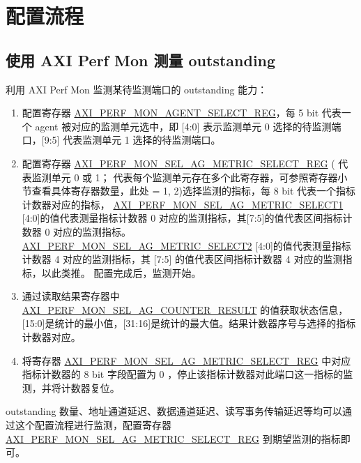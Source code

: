 \documentclass[main\_\_CN.tex]{subfiles}
\begin{document}

\section{配置流程}
\label{sec:aximon-prog-procedures}


\subsection{使用 AXI Perf Mon 测量 outstanding}
利用 AXI Perf Mon 监测某待监测端口的 outstanding 能力：
\begin{enumerate}
    \item 配置寄存器 \hyperref[regdesc:AXIPERFMONAGENTSELECTREG]{AXI\_PERF\_MON\_AGENT\_SELECT\_REG}，每 5 bit 代表一个 agent 被对应的监测单元选中，即 [4:0] 表示监测单元 0 选择的待监测端口，[9:5] 代表监测单元 1 选择的待监测端口。
    \item 配置寄存器 \hyperref[regdesc:AXIPERFMONSELAGNMETRICSELECTMREG]{AXI\_PERF\_MON\_SEL\_AG\_METRIC\_SELECT\_REG} ( 代表监测单元 0 或 1； 代表每个监测单元存在多个此寄存器，可参照寄存器小节查看具体寄存器数量，此处  = 1, 2)选择监测的指标，每 8 bit 代表一个指标计数器对应的指标，  \hyperref[fielddesc:AXIPERFMONSELAGNMETRICSELECTM]{AXI\_PERF\_MON\_SEL\_AG\_METRIC\_SELECT1} [4:0]的值代表测量指标计数器 0 对应的监测指标，其[7:5]的值代表区间指标计数器 0 对应的监测指标。\hyperref[fielddesc:AXIPERFMONSELAGNMETRICSELECTM]{AXI\_PERF\_MON\_SEL\_AG\_METRIC\_SELECT2} [4:0]的值代表测量指标计数器 4 对应的监测指标，其 [7:5] 的值代表区间指标计数器 4 对应的监测指标，以此类推。
    配置完成后，监测开始。
    \item 通过读取结果寄存器中 \hyperref[fielddesc:AXIPERFMONSELAGNCOUNTERMRESULT]{AXI\_PERF\_MON\_SEL\_AG\_COUNTER\_RESULT} 的值获取状态信息，[15:0]是统计的最小值，[31:16]是统计的最大值。结果计数器序号与选择的指标计数器对应。 
    \item 将寄存器 \hyperref[regdesc:AXIPERFMONSELAGNMETRICSELECTMREG]{AXI\_PERF\_MON\_SEL\_AG\_METRIC\_SELECT\_REG} 中对应指标计数器的 8 bit 字段配置为 0 ，停止该指标计数器对此端口这一指标的监测，并将计数器复位。
\end{enumerate}

outstanding 数量、地址通道延迟、数据通道延迟、读写事务传输延迟等均可以通过这个配置流程进行监测，配置寄存器 \hyperref[regdesc:AXIPERFMONSELAGNMETRICSELECTMREG]{AXI\_PERF\_MON\_SEL\_AG\_METRIC\_SELECT\_REG} 到期望监测的指标即可。
\end{document}
